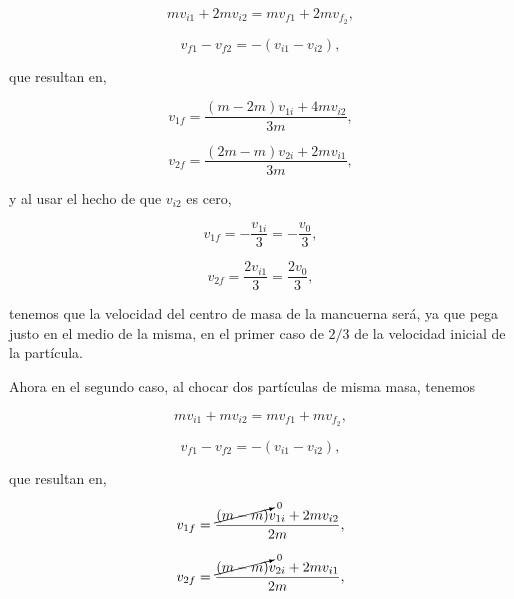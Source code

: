 \documentclass[a4paper,10pt]{article}
\numberwithin{equation}{section}
\begin{document}
\begin{equation}
 mv_{i1} + 2mv_{i2} = mv_{f1} + 2mv_{f_2},
\end{equation}

\begin{equation}
 v_{f1} - v_{f2} = - (v_{i1} - v_{i2}),
\end{equation}

que resultan en, 

\begin{equation}
 v_{1f} = \frac{(m - 2m)v_{1i} + 4mv_{i2}}{3m},
\end{equation}

\begin{equation}
  v_{2f} = \frac{(2m - m)v_{2i} + 2mv_{i1}}{3m},
\end{equation}

y al usar el hecho de que $v_{i2}$ es cero, 

\begin{equation}
 v_{1f} = - \frac{v_{1i}}{3} = - \frac{v_0}{3},
\end{equation}

\begin{equation}
  v_{2f} = \frac{2v_{i1}}{3} = \frac{2v_0}{3},
\end{equation}

tenemos que la velocidad del centro de masa de la mancuerna será, ya que pega justo en el 
medio de la misma, en el primer caso de $2/3$ de la velocidad inicial de la partícula.

\vspace{.3cm}

Ahora en el segundo caso, al chocar dos partículas de misma masa, tenemos 

\begin{equation}
 mv_{i1} + mv_{i2} = mv_{f1} + mv_{f_2},
\end{equation}

\begin{equation}
 v_{f1} - v_{f2} = - (v_{i1} - v_{i2}),
\end{equation}

que resultan en, 

\begin{equation}
 v_{1f} = \frac{\cancelto{0}{(m - m)}v_{1i} + 2mv_{i2}}{2m},
\end{equation}

\begin{equation}
  v_{2f} = \frac{\cancelto{0}{(m - m)}v_{2i} + 2mv_{i1}}{2m},
\end{equation}
\end{document}

